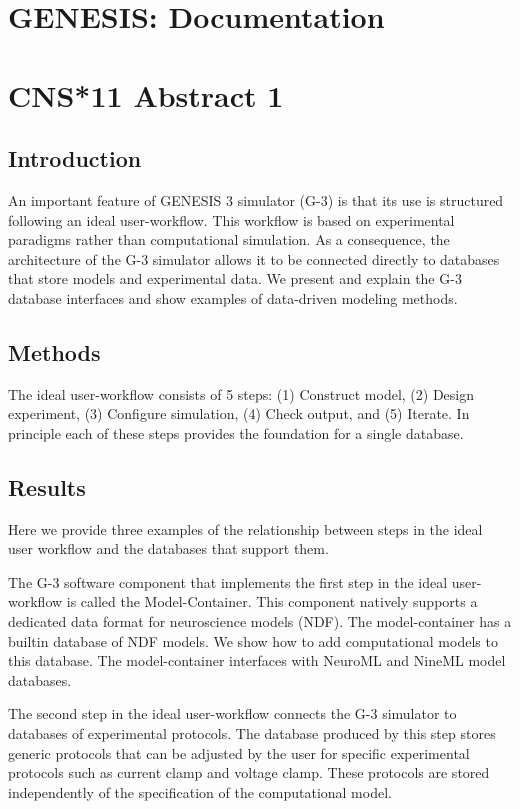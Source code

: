 \documentclass[12pt]{article}
\begin{document}
\section*{GENESIS: Documentation}

\section*{CNS*11 Abstract 1}

\subsection*{Introduction}

An important feature of GENESIS 3 simulator (G-3) is that its use is
structured following an ideal user-workflow.  This workflow is
based on experimental paradigms rather than computational simulation.
As a consequence, the architecture of the G-3 simulator allows it to be connected
directly to databases that store models and experimental data.  We present and
explain the G-3 database interfaces and show examples of
data-driven modeling methods.


\subsection*{Methods}

The ideal user-workflow consists of 5 steps: (1) Construct model, (2) Design experiment, (3) Configure simulation, (4) Check output, and (5) Iterate.
In principle each of these steps provides the foundation for a single database. 

\subsection*{Results}

Here we provide three examples of the relationship between steps in the ideal user workflow and the databases that support them.

The G-3 software component that implements the first step in the ideal
user-workflow is called the Model-Container.  This component
natively supports a dedicated data format for neuroscience models
(NDF).  The model-container has a builtin database of NDF models.  We
show how to add computational models to this database.  The
model-container interfaces with NeuroML and NineML model databases.

The second step in the ideal user-workflow connects the G-3 simulator
to databases of experimental protocols.  The database produced by this
step stores generic protocols that can be adjusted by the user for
specific experimental protocols such as current clamp and voltage
clamp.  These protocols are stored independently of the specification
of the computational model.
\end{document}
